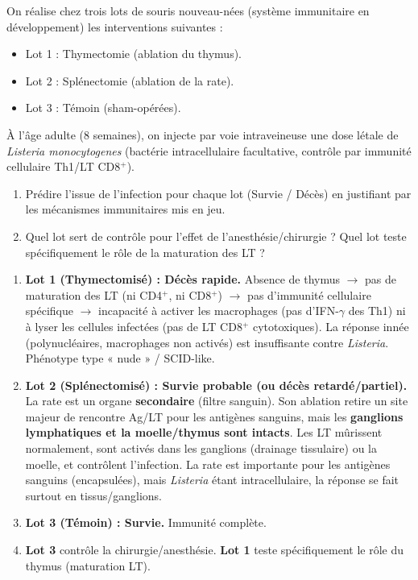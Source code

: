 \documentclass[11pt]{article}
\begin{document}
\begin{exercice}
On réalise chez trois lots de souris nouveau-nées (système immunitaire en développement) les interventions suivantes :
\begin{itemize}
\item Lot 1 : Thymectomie (ablation du thymus).
\item Lot 2 : Splénectomie (ablation de la rate).
\item Lot 3 : Témoin (sham-opérées).
\end{itemize}
À l'âge adulte (8 semaines), on injecte par voie intraveineuse une dose létale de \emph{Listeria monocytogenes} (bactérie intracellulaire facultative, contrôle par immunité cellulaire Th1/LT CD8$^+$).
\begin{enumerate}
\item Prédire l'issue de l'infection pour chaque lot (Survie / Décès) en justifiant par les mécanismes immunitaires mis en jeu.
\item Quel lot sert de contrôle pour l'effet de l'anesthésie/chirurgie ? Quel lot teste spécifiquement le rôle de la maturation des LT ?
\end{enumerate}
\end{exercice}

\begin{corrige}
\begin{enumerate}
\item \textbf{Lot 1 (Thymectomisé) : Décès rapide.} Absence de thymus $\rightarrow$ pas de maturation des LT (ni CD4$^+$, ni CD8$^+$) $\rightarrow$ pas d'immunité cellulaire spécifique $\rightarrow$ incapacité à activer les macrophages (pas d'IFN-$\gamma$ des Th1) ni à lyser les cellules infectées (pas de LT CD8$^+$ cytotoxiques). La réponse innée (polynucléaires, macrophages non activés) est insuffisante contre \emph{Listeria}. Phénotype type « nude » / SCID-like.
\item \textbf{Lot 2 (Splénectomisé) : Survie probable (ou décès retardé/partiel).} La rate est un organe \textbf{secondaire} (filtre sanguin). Son ablation retire un site majeur de rencontre Ag/LT pour les antigènes sanguins, mais les \textbf{ganglions lymphatiques et la moelle/thymus sont intacts}. Les LT mûrissent normalement, sont activés dans les ganglions (drainage tissulaire) ou la moelle, et contrôlent l'infection. La rate est importante pour les antigènes sanguins (encapsulées), mais \emph{Listeria} étant intracellulaire, la réponse se fait surtout en tissus/ganglions.
\item \textbf{Lot 3 (Témoin) : Survie.} Immunité complète.
\item \textbf{Lot 3} contrôle la chirurgie/anesthésie. \textbf{Lot 1} teste spécifiquement le rôle du thymus (maturation LT).
\end{enumerate}
\end{corrige}
\end{document}
